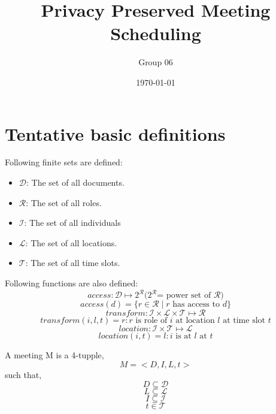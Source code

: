 \documentclass{article}
\title{Privacy Preserved Meeting Scheduling}
\author{Group 06}
\date{\today} %
\begin{document}
\maketitle

\section{Tentative basic definitions}

\noindent
Following finite sets are defined:
\begin{itemize}
    \item $\mathcal{D}$: The set of all documents.
    \item $\mathcal{R}$: The set of all roles.
    \item $\mathcal{I}$: The set of all individuals
    \item $\mathcal{L}$: The set of all locations.
    \item $\mathcal{T}$: The set of all time slots.
\end{itemize}

\noindent
Following functions are also defined:
    \[ access: \mathcal{D} \mapsto 2^\mathcal{R} \text{(} 2^\mathcal{R} \text{= power set of } \mathcal{R} \text{)} \] 
    \[ access(d) = \{ r \in \mathcal{R} \mid r \text{ has access to } d \} \] 
    \[ transform: \mathcal{I} \times \mathcal{L} \times \mathcal{T} \mapsto \mathcal{R} \] 
    \[ transform(i, l, t) = r : r \text{ is role of } i \text{ at location } l \text{ at time slot } t \] 
    \[ location: \mathcal{I} \times \mathcal{T} \mapsto \mathcal{L} \] 
    \[ location(i, t)  = l : i \text{ is at } l \text{ at } t \]

\noindent
A meeting M is a 4-tupple,
    \[ M = < D, I, L, t > \]
such that,
    \[ D \subseteq \mathcal{D} \]
    \[ L \subseteq \mathcal{L} \]
    \[ I \subseteq \mathcal{I} \]
    \[ t \in \mathcal{T} \]


\end{document}
